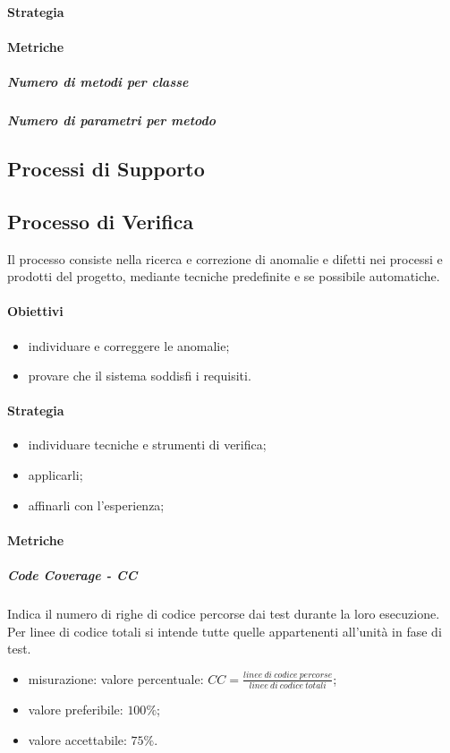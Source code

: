 		\paragraph{Strategia}
		
		\paragraph{Metriche}
			\subparagraph{Numero di metodi per classe}
			\subparagraph{Numero di parametri per metodo}
		
\subsection{Processi di Supporto}
	\subsection{Processo di Verifica}
	Il processo consiste nella ricerca e correzione di anomalie e difetti nei processi e prodotti del progetto, mediante tecniche predefinite e se possibile automatiche.
		\paragraph{Obiettivi}
		\begin{itemize}
			\item individuare e correggere le anomalie;
			\item provare che il sistema soddisfi i requisiti.
		\end{itemize}	
		\paragraph{Strategia}
		\begin{itemize}
			\item individuare tecniche e strumenti di verifica;
			\item applicarli;
			\item affinarli con l'esperienza;
		\end{itemize}	
		\paragraph{Metriche}
			\subparagraph{Code Coverage - CC}
				Indica il numero di righe di codice percorse dai test durante la loro esecuzione. Per linee di codice totali si intende tutte quelle appartenenti all'unità in fase di test.
				\begin{itemize}
					\item misurazione: valore percentuale: $CC = \frac{linee\ di\ codice\ percorse}{linee\ di\ codice\ totali}$;
					\item valore preferibile: $100\%$;
					\item valore accettabile: $75\%$.
				\end{itemize}


